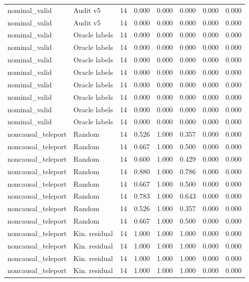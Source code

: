 {\begin{longtable}{llrrrrrr}
nominal\_valid & Audit v5 & 14 & 0.000 & 0.000 & 0.000 & 0.000 & 0.000 \\
nominal\_valid & Audit v5 & 14 & 0.000 & 0.000 & 0.000 & 0.000 & 0.000 \\
nominal\_valid & Oracle labels & 14 & 0.000 & 0.000 & 0.000 & 0.000 & 0.000 \\
nominal\_valid & Oracle labels & 14 & 0.000 & 0.000 & 0.000 & 0.000 & 0.000 \\
nominal\_valid & Oracle labels & 14 & 0.000 & 0.000 & 0.000 & 0.000 & 0.000 \\
nominal\_valid & Oracle labels & 14 & 0.000 & 0.000 & 0.000 & 0.000 & 0.000 \\
nominal\_valid & Oracle labels & 14 & 0.000 & 0.000 & 0.000 & 0.000 & 0.000 \\
nominal\_valid & Oracle labels & 14 & 0.000 & 0.000 & 0.000 & 0.000 & 0.000 \\
nominal\_valid & Oracle labels & 14 & 0.000 & 0.000 & 0.000 & 0.000 & 0.000 \\
nominal\_valid & Oracle labels & 14 & 0.000 & 0.000 & 0.000 & 0.000 & 0.000 \\
noncausal\_teleport & Random & 14 & 0.526 & 1.000 & 0.357 & 0.000 & 0.000 \\
noncausal\_teleport & Random & 14 & 0.667 & 1.000 & 0.500 & 0.000 & 0.000 \\
noncausal\_teleport & Random & 14 & 0.600 & 1.000 & 0.429 & 0.000 & 0.000 \\
noncausal\_teleport & Random & 14 & 0.880 & 1.000 & 0.786 & 0.000 & 0.000 \\
noncausal\_teleport & Random & 14 & 0.667 & 1.000 & 0.500 & 0.000 & 0.000 \\
noncausal\_teleport & Random & 14 & 0.783 & 1.000 & 0.643 & 0.000 & 0.000 \\
noncausal\_teleport & Random & 14 & 0.526 & 1.000 & 0.357 & 0.000 & 0.000 \\
noncausal\_teleport & Random & 14 & 0.667 & 1.000 & 0.500 & 0.000 & 0.000 \\
noncausal\_teleport & Kin. residual & 14 & 1.000 & 1.000 & 1.000 & 0.000 & 0.000 \\
noncausal\_teleport & Kin. residual & 14 & 1.000 & 1.000 & 1.000 & 0.000 & 0.000 \\
noncausal\_teleport & Kin. residual & 14 & 1.000 & 1.000 & 1.000 & 0.000 & 0.000 \\
noncausal\_teleport & Kin. residual & 14 & 1.000 & 1.000 & 1.000 & 0.000 & 0.000 \\

\end{longtable}}
